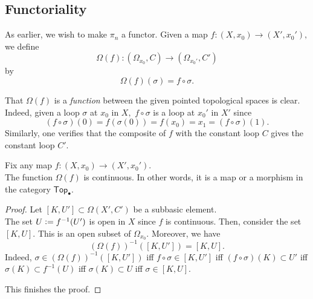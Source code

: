 \documentclass[12pt]{article}
\begin{document}

\subsection{Functoriality}

As earlier, we wish to make $\pi_n$ a functor. Given a map $f:(X, x_0) \to (X', x_0'),$ we define
\begin{equation*} 
	\Omega(f) : (\Omega_{x_0}, C) \to (\Omega_{x_0'}, C')
\end{equation*}
by
\begin{equation*} 
	\Omega(f)(\sigma) = f\circ\sigma.
\end{equation*}

That $\Omega(f)$ is a \emph{function} between the given pointed topological spaces is clear. Indeed, given a loop $\sigma$ at $x_0$ in $X,$ $f\circ\sigma$ is a loop at $x_0'$ in $X'$ since
\begin{equation*} 
	(f\circ\sigma)(0) = f(\sigma(0)) = f(x_0) = x_1 = (f\circ\sigma)(1).
\end{equation*}
Similarly, one verifies that the composite of $f$ with the constant loop $C$ gives the constant loop $C'.$

\begin{prop}
	Fix any map $f:(X, x_0) \to (X', x_0').$\\
	The function $\Omega(f)$ is continuous. In other words, it is a map or a morphism in the category $\mathsf{Top}_\bullet.$
\end{prop}
\begin{proof} 
	Let $[K, U'] \subset \Omega(X', C')$ be a subbasic element. \\
	The set $U \vcentcolon= f^{-1}(U')$ is open in $X$ since $f$ is continuous. Then, consider the set $[K, U].$ This is an open subset of $\Omega_{x_0}.$ Moreover, we have
	\begin{equation*} 
		(\Omega(f))^{-1}([K, U']) = [K, U].
	\end{equation*}
	Indeed, $\sigma \in (\Omega(f))^{-1}([K, U'])$ iff $f\circ\sigma \in [K, U']$ iff $(f\circ\sigma)(K) \subset U'$ iff $\sigma(K) \subset f^{-1}(U)$ iff $\sigma(K) \subset U$ iff $\sigma \in [K, U].$

	This finishes the proof.
\end{proof}
\end{document}
